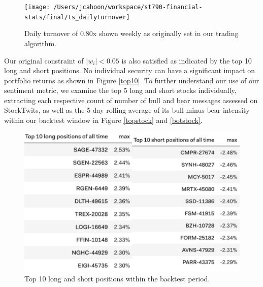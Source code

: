 \documentclass[11,]{article}
\begin{document}
\begin{figure}

{\centering \texttt{[image: /Users/jcahoon/workspace/st790-financial-stats/final/ts\_dailyturnover]} 

}

\caption{\label{turnover}Daily turnover of 0.80x shown weekly as originally set in our trading algorithm.}\label{fig:unnamed-chunk-11}
\end{figure}

Our original constraint of \(|w_i| < 0.05\) is also satisfied as
indicated by the top 10 long and short positions. No individual security
can have a significant impact on portfolio returns as shown in Figure
\ref{top10}. To further understand our use of our sentiment metric, we
examine the top 5 long and short stocks individually, extracting each
respective count of number of bull and bear messages assessed on
StockTwits, as well as the 5-day rolling average of its bull minus bear
intensity within our backtest window in Figure \ref{topstock} and
\ref{botstock}.

\begin{figure}

{\centering \includegraphics[width=0.6\linewidth]{cahoon_final_paper_files/figure-latex/unnamed-chunk-12-1} 

}

\caption{\label{top10}Top 10 long and short positions within the backtest period.}\label{fig:unnamed-chunk-12}
\end{figure}
\end{document}
